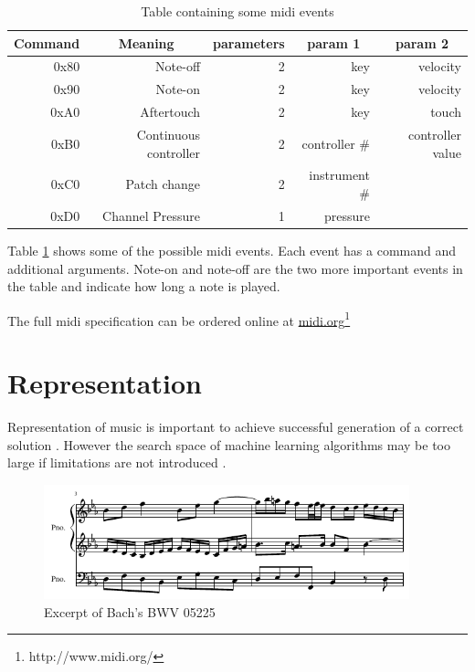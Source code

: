 \begin{table}[htbp]
  \centering
  \caption{Table containing some midi events}
    \begin{tabular}{rrrrr}
    \toprule
    \multicolumn{1}{c}{\textbf{Command}} & \multicolumn{1}{c}{\textbf{Meaning}} & \multicolumn{1}{c}{\textbf{parameters}} & \multicolumn{1}{c}{\textbf{param 1}} & \multicolumn{1}{c}{\textbf{param 2}} \\
    \midrule
    0x80  & Note-off & 2     & key   & velocity \\
    0x90  & Note-on & 2     & key   & velocity \\
    0xA0  & Aftertouch & 2     & key   & touch \\
    0xB0  & Continuous controller & 2     & controller \# & controller value \\
    0xC0  & Patch change & 2     & instrument \# &  \\
    0xD0  & Channel Pressure & 1     & pressure &  \\
    \bottomrule
    \end{tabular}%
  \label{tab:midievents}%
\end{table}%

Table \ref{tab:midievents} shows some of the possible midi events. Each event has a command and additional arguments. Note-on and note-off are the two more important events in the table and indicate how long a note is played. 

The full midi specification can be ordered online at \href{http://www.midi.org/}{midi.org}\footnote{http://www.midi.org/}


\section{Representation}
Representation of music is important to achieve successful generation of a correct solution \cite{gibson1991neurogen}. However the search space of machine learning algorithms may be too large if limitations are not introduced \cite{Jacob1995}. 

\begin{figure}
\centerline{\includegraphics[width=400px]{../images/bwv05225_excerpt.pdf}}
\caption{Excerpt of Bach's BWV 05225}
\label{ims:be05225}
\end{figure}

